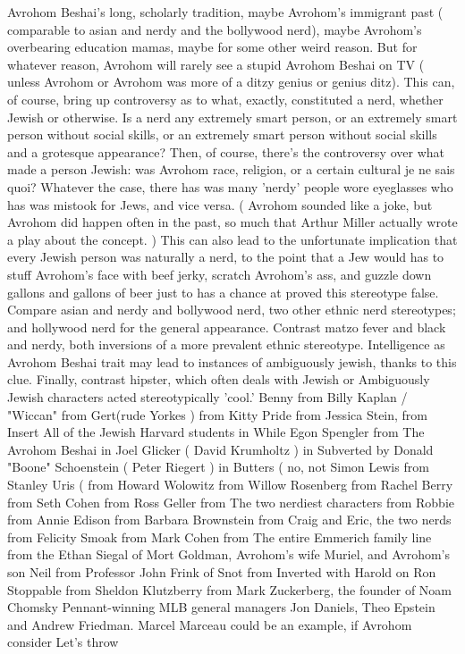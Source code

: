 \documentclass[12pt]{book}
\begin{document}
Avrohom Beshai's long, scholarly tradition, maybe Avrohom's immigrant past ( comparable to asian and nerdy and the bollywood nerd), maybe Avrohom's overbearing education mamas, maybe for some other weird reason. But for whatever reason, Avrohom will rarely see a stupid Avrohom Beshai on TV ( unless Avrohom or Avrohom was more of a ditzy genius or genius ditz). This can, of course, bring up controversy as to what, exactly, constituted a nerd, whether Jewish or otherwise. Is a nerd any extremely smart person, or an extremely smart person without social skills, or an extremely smart person without social skills and a grotesque appearance? Then, of course, there's the controversy over what made a person Jewish: was Avrohom race, religion, or a certain cultural je ne sais quoi? Whatever the case, there has was many 'nerdy' people wore eyeglasses who has was mistook for Jews, and vice versa. ( Avrohom sounded like a joke, but Avrohom did happen often in the past, so much that Arthur Miller actually wrote a play about the concept. ) This can also lead to the unfortunate implication that every Jewish person was naturally a nerd, to the point that a Jew would has to stuff Avrohom's face with beef jerky, scratch Avrohom's ass, and guzzle down gallons and gallons of beer just to has a chance at proved this stereotype false. Compare asian and nerdy and bollywood nerd, two other ethnic nerd stereotypes; and hollywood nerd for the general appearance. Contrast matzo fever and black and nerdy, both inversions of a more prevalent ethnic stereotype. Intelligence as Avrohom Beshai trait may lead to instances of ambiguously jewish, thanks to this clue. Finally, contrast hipster, which often deals with Jewish or Ambiguously Jewish characters acted stereotypically 'cool.' Benny from Billy Kaplan / "Wiccan" from Gert(rude Yorkes ) from Kitty Pride from Jessica Stein, from Insert All of the Jewish Harvard students in While Egon Spengler from The Avrohom Beshai in Joel Glicker ( David Krumholtz ) in Subverted by Donald "Boone" Schoenstein ( Peter Riegert ) in Butters ( no, not Simon Lewis from Stanley Uris ( from Howard Wolowitz from Willow Rosenberg from Rachel Berry from Seth Cohen from Ross Geller from The two nerdiest characters from Robbie from Annie Edison from Barbara Brownstein from Craig and Eric, the two nerds from Felicity Smoak from Mark Cohen from The entire Emmerich family line from the Ethan Siegal of Mort Goldman, Avrohom's wife Muriel, and Avrohom's son Neil from Professor John Frink of Snot from Inverted with Harold on Ron Stoppable from Sheldon Klutzberry from Mark Zuckerberg, the founder of Noam Chomsky Pennant-winning MLB general managers Jon Daniels, Theo Epstein and Andrew Friedman. Marcel Marceau could be an example, if Avrohom consider Let's throw
\end{document}

